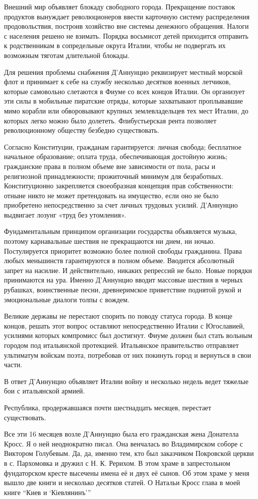 Внешний мир объявляет блокаду свободного города. Прекращение поставок продуктов
вынуждает революционеров ввести карточную систему распределения продовольствия,
построив хозяйство вне системы денежного обращения. Налоги с населения решено
не взимать. Порядка восьмисот детей приходится отправить к родственникам в
сопредельные округа Италии, чтобы не подвергать их возможным тяготам длительной
блокады. 

Для решения проблемы снабжения Д'Аннунцио реквизирует местный морской флот и
принимает к себе на службу несколько десятков военных летчиков, которые
самовольно слетаются в Фиуме со всех концов Италии. Он организует эти силы в
мобильные пиратские отряды, которые захватывают проплывавшие мимо корабли или
обворовывают крупных землевладельцев тех мест Италии, до которых легко можно
было долететь. Флибустьерская рента позволяет революционному обществу безбедно
существовать.

Согласно Конституции, гражданам гарантируется: личная свобода; бесплатное
начальное образование; оплата труда, обеспечивающая достойную жизнь;
гражданские права в полном объеме вне зависимости от пола, расы и религиозной
принадлежности; прожиточный минимум для безработных. Конституционно
закрепляется своеобразная концепция прав собственности: отныне никто не может
претендовать на имущество, если оно не было приобретено непосредственно за счет
личных трудовых усилий. Д'Аннунцио выдвигает лозунг «труд без утомления».

Фундаментальным принципом организации государства объявляется музыка, поэтому
карнавальные шествия не прекращаются ни днем, ни ночью. Постулируется приоритет
возможно более полной свободы гражданина. Права любых меньшинств гарантируются
в полном объеме. Вводится абсолютный запрет на насилие. И действительно,
никаких репрессий не было. Новые порядки принимаются на ура. Именно Д’Аннунцио
вводит массовые шествия в черных рубашках, воинственные песни, древнеримское
приветствие поднятой рукой и эмоциональные диалоги толпы с вождем. 

Великие державы не перестают спорить по поводу статуса города. В конце концов,
решать этот вопрос оставляют непосредственно Италии с Югославией, усилиями
которых компромисс был достигнут. Фиуме должен был стать вольным городом под
итальянской протекцией. Итальянское правительство отправляет ультиматум войскам
поэта, потребовав от них покинуть город и вернуться в свои части. 

В ответ Д'Аннунцио объявляет Италии войну и несколько недель ведет тяжелые бои
с итальянской армией.

Республика, продержавшаяся почти шестнадцать месяцев, перестает существовать.

Все эти 16 месяцев возле Д'Аннунцио была его гражданская жена Донателла Кросс.
Я о ней неоднократно писал. Она венчалась во Владимирском соборе с Виктором
Голубевым. Да, да, именно тем, кто был заказчиком Покровской церкви в с.
Пархомовка и дружил с Н. К. Рерихом. В этом храме в запрестольном фундаторском
кресте высечены имена её и двух её сынов. Об этом храме у меня вышло две книги
и несколько десятков статей. О Натальи Кросс глава в моей книге \enquote{Киев и
\enquote{Кіевлянинъ}}

